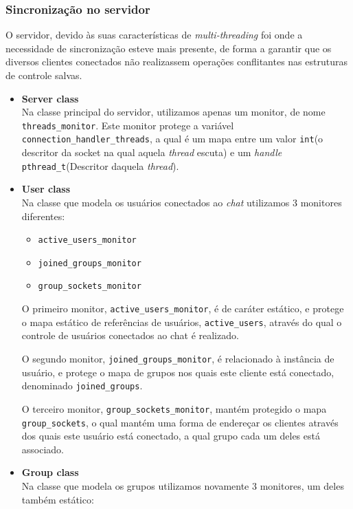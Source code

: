 \documentclass{article}
\begin{document}
\subsubsection{Sincronização no servidor}
\par O servidor, devido às suas características de \textit{multi-threading} foi onde a necessidade de sincronização esteve mais presente, de forma a garantir que os diversos clientes conectados não realizassem operações conflitantes nas estruturas de controle salvas.
\begin{itemize}
    \item \textbf{Server class}
        \\Na classe principal do servidor, utilizamos apenas um monitor, de nome \texttt{threads\_monitor}. Este monitor protege a variável \texttt{connection\_handler\_threads}, a qual é um mapa entre um valor \texttt{int}(o descritor da socket na qual aquela \textit{thread} escuta) e um \textit{handle} \texttt{pthread\_t}(Descritor daquela \textit{thread}).
    \item \textbf{User class}
        \\Na classe que modela os usuários conectados ao \textit{chat} utilizamos 3 monitores diferentes:
        \begin{itemize}
            \item \texttt{active\_users\_monitor} 
            \item \texttt{joined\_groups\_monitor}
            \item \texttt{group\_sockets\_monitor}
        \end{itemize}
        \par O primeiro monitor, \texttt{active\_users\_monitor}, é de caráter estático, e protege o mapa estático de referências de usuários, \texttt{active\_users}, através do qual o controle de usuários conectados ao chat é realizado.
        \par O segundo monitor, \texttt{joined\_groups\_monitor}, é relacionado à instância de usuário, e protege o mapa de grupos nos quais este cliente está conectado, denominado \texttt{joined\_groups}.
        \par O terceiro monitor, \texttt{group\_sockets\_monitor}, mantém protegido o mapa \texttt{group\_sockets}, o qual mantém uma forma de endereçar os clientes através dos quais este usuário está conectado, a qual grupo cada um deles está associado.
    \item \textbf{Group class}
    \\Na classe que modela os grupos utilizamos novamente 3 monitores, um deles também estático:

\end{itemize}
\end{document}
